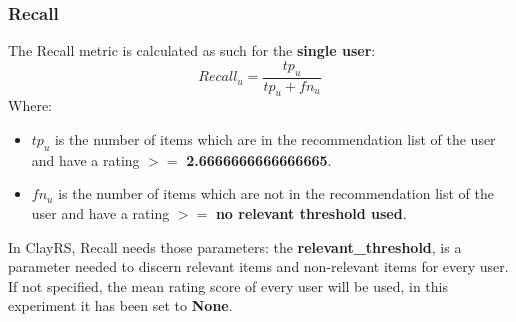 \documentclass[11pt]{article}
\begin{document}
\subsubsection{Recall}\label{subsubsec:recall}
The Recall metric is calculated as such for the \textbf{single user}:
\hfill\break
\hfill\break
    \[
        Recall_u = \frac{tp_u}{tp_u + fn_u}
    \]
\hfill\break
\hfill\break
    Where:
\begin{itemize}
    \item $tp_u$ is the number of items which are in the recommendation list of the user and have a
      rating $>=$         \textbf{2.6666666666666665}.
            \item $fn_u$ is the number of items which are not in the recommendation list of the user and have a
      rating $>=$         \textbf{no relevant threshold used}.
        \end{itemize}
\hfill\break
\hfill\break
In ClayRS, Recall needs those parameters:
the \textbf{relevant\_threshold}, is a parameter needed to discern relevant items and non-relevant items for every user.
If not specified, the mean rating score of every user will be used, in this experiment it has been set to
\textbf{None}.
\hfill\break
\hfill\break

\end{document}
